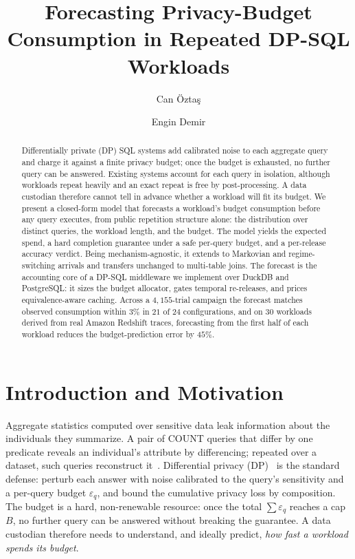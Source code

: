 \documentclass[sigconf,nonacm]{acmart}
\newcommand{\eps}{\varepsilon}
\begin{document}
\title{Forecasting Privacy-Budget Consumption in Repeated DP-SQL Workloads}
\author{Can \"Ozta\c{s}}

\author{Engin Demir}

\begin{abstract}
Differentially private (DP) SQL systems add calibrated noise to each aggregate query and charge it against a finite privacy budget; once the budget is exhausted, no further query can be answered. Existing systems account for each query in isolation, although workloads repeat heavily and an exact repeat is free by post-processing. A data custodian therefore cannot tell in advance whether a workload will fit its budget. We present a closed-form model that forecasts a workload's budget consumption before any query executes, from public repetition structure alone: the distribution over distinct queries, the workload length, and the budget. The model yields the expected spend, a hard completion guarantee under a safe per-query budget, and a per-release accuracy verdict. Being mechanism-agnostic, it extends to Markovian and regime-switching arrivals and transfers unchanged to multi-table joins. The forecast is the accounting core of a DP-SQL middleware we implement over DuckDB and PostgreSQL: it sizes the budget allocator, gates temporal re-releases, and prices equivalence-aware caching. Across a $4{,}155$-trial campaign the forecast matches observed consumption within $3\%$ in $21$ of $24$ configurations, and on $30$ workloads derived from real Amazon Redshift traces, forecasting from the first half of each workload reduces the budget-prediction error by $45\%$.
\end{abstract}

\maketitle

\section{Introduction and Motivation}
\label{sec:intro}

Aggregate statistics computed over sensitive data leak information about the individuals they summarize. A pair of COUNT queries that differ by one predicate reveals an individual's attribute by differencing; repeated over a dataset, such queries reconstruct it~\cite{dinur2003revealing}. Differential privacy (DP)~\cite{dwork2006calibrating,dwork2014algorithmic} is the standard defense: perturb each answer with noise calibrated to the query's sensitivity and a per-query budget $\eps_q$, and bound the cumulative privacy loss by composition. The budget is a hard, non-renewable resource: once the total $\sum\eps_q$ reaches a cap $B$, no further query can be answered without breaking the guarantee. A data custodian therefore needs to understand, and ideally predict, \emph{how fast a workload spends its budget}.
\end{document}
